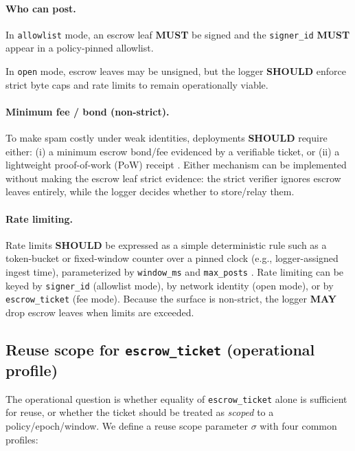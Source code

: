 \documentclass[11pt]{article}
\newcommand{\MUST}{\textbf{MUST}}
\newcommand{\SHOULD}{\textbf{SHOULD}}
\newcommand{\MAY}{\textbf{MAY}}
\newcommand{\code}[1]{\texttt{#1}}
\newcommand{\1}{\mathbf{1}}
\theoremstyle{definition}
\theoremstyle{plain}
\begin{document}
\paragraph{Who can post.}
\begin{tightitemize}
\item In \code{allowlist} mode, an escrow leaf \MUST{} be signed and the \code{signer\_id} \MUST{} appear in a policy-pinned allowlist.
\item In \code{open} mode, escrow leaves may be unsigned, but the logger \SHOULD{} enforce strict byte caps and rate limits to remain operationally viable.
\end{tightitemize}

\paragraph{Minimum fee / bond (non-strict).}
To make spam costly under weak identities, deployments \SHOULD{} require either:
(i) a minimum escrow bond/fee evidenced by a verifiable ticket, or
(ii) a lightweight proof-of-work (PoW) receipt \cite{DworkNaor1992,BackHashcash2002}.
Either mechanism can be implemented without making the escrow leaf strict evidence: the strict verifier ignores escrow leaves entirely, while the logger decides whether to store/relay them.

\paragraph{Rate limiting.}
Rate limits \SHOULD{} be expressed as a simple deterministic rule such as a token-bucket or fixed-window counter over a pinned clock (e.g., logger-assigned ingest time), parameterized by \code{window\_ms} and \code{max\_posts} \cite{RFC2697,RFC2698}.
Rate limiting can be keyed by \code{signer\_id} (allowlist mode), by network identity (open mode), or by \code{escrow\_ticket} (fee mode).
Because the surface is non-strict, the logger \MAY{} drop escrow leaves when limits are exceeded.

\subsection{Reuse scope for \texttt{escrow\_ticket} (operational profile)}

The operational question is whether equality of \code{escrow\_ticket} alone is sufficient for reuse, or whether the ticket should be treated as \emph{scoped} to a policy/epoch/window.
We define a reuse scope parameter $\sigma$ with four common profiles:
\end{document}
